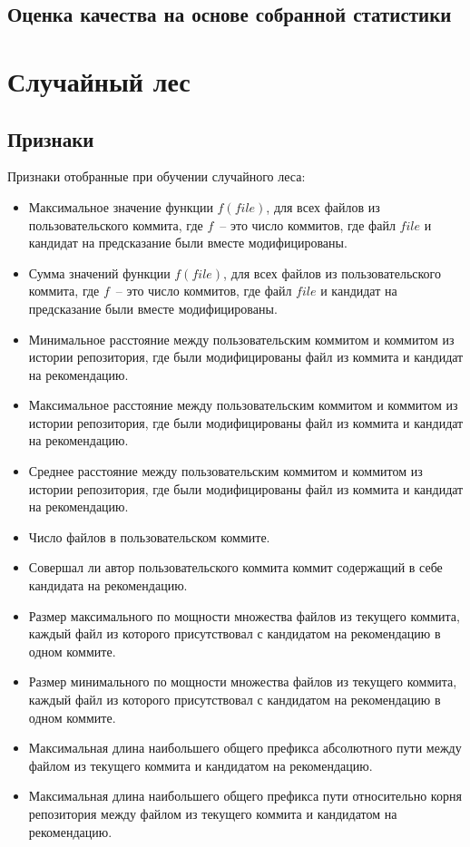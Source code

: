 \subsection{Оценка качества на основе собранной статистики}
\section{Случайный лес}
\subsection{Признаки}
Признаки отобранные при обучении случайного леса:
\begin{itemize}
    \item Максимальное значение функции $f(file)$, для всех файлов из пользовательского коммита, где $f$~-- это число коммитов, где файл $file$ и кандидат на предсказание были вместе модифицированы.
    \item Сумма значений функции $f(file)$, для всех файлов из пользовательского коммита, где $f$~-- это число коммитов, где файл $file$ и кандидат на предсказание были вместе модифицированы.
    \item Минимальное расстояние между пользовательским коммитом и коммитом из истории репозитория, где были модифицированы файл из коммита и кандидат на рекомендацию.
    \item Максимальное расстояние между пользовательским коммитом и коммитом из истории репозитория, где были модифицированы файл из коммита и кандидат на рекомендацию.
    \item Среднее расстояние между пользовательским коммитом и коммитом из истории репозитория, где были модифицированы файл из коммита и кандидат на рекомендацию.
    \item Число файлов в пользовательском коммите.
    \item Совершал ли автор пользовательского коммита коммит содержащий в себе кандидата на рекомендацию.
    \item Размер максимального по мощности множества файлов из текущего коммита, каждый файл из которого присутствовал с кандидатом на рекомендацию в одном коммите.
    \item Размер минимального по мощности множества файлов из текущего коммита, каждый файл из которого присутствовал с кандидатом на рекомендацию в одном коммите.
    \item Максимальная длина наибольшего общего префикса абсолютного пути между файлом из текущего коммита и кандидатом на рекомендацию.
    \item Максимальная длина наибольшего общего префикса пути относительно корня репозитория между файлом из текущего коммита и кандидатом на рекомендацию.
\end{itemize}

